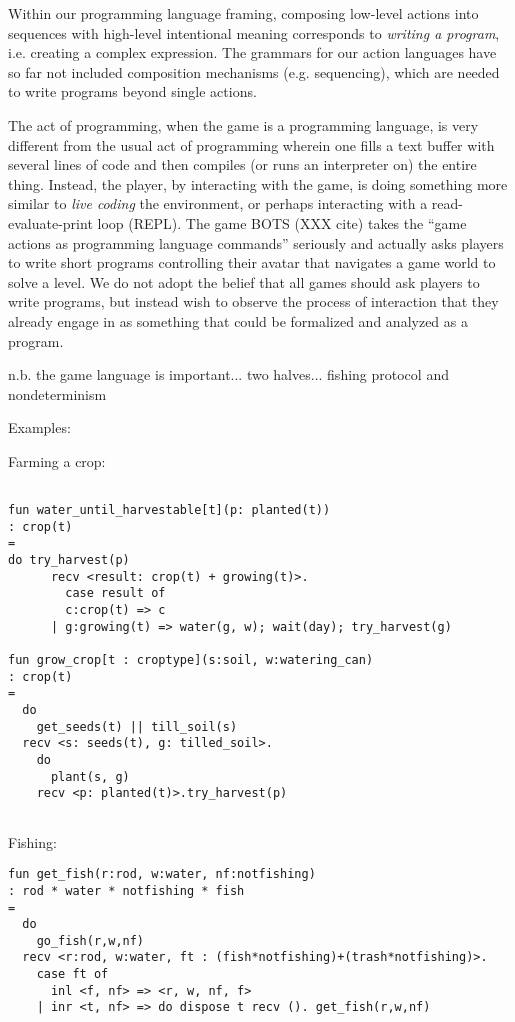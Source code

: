\documentclass[sigconf]{acmart}
\begin{document}
Within our programming language framing,
composing low-level actions into sequences with high-level intentional
meaning corresponds to {\em writing a program}, i.e. creating a complex
expression. The grammars for our action languages have so far not
included composition mechanisms (e.g. sequencing), which are needed to
write programs beyond single actions.

The act of programming, when the game is a programming language, is very
different from the usual act of programming wherein one fills a text buffer
with several lines of code and then compiles (or runs an interpreter on)
the entire thing. Instead, the player, by interacting with the game, is
doing something more similar to {\em live coding} the environment, or
perhaps interacting with a read-evaluate-print loop (REPL). The game BOTS
(XXX cite) takes the ``game actions as programming language commands''
seriously and actually asks players to write short programs controlling
their avatar that navigates a game world to solve a level. We do not adopt
the belief that all games should ask players to write programs, but instead
wish to observe the process of interaction that they already engage in as
something that could be formalized and analyzed as a program.

n.b. the game language is important... two halves...
fishing protocol and nondeterminism

Examples:

Farming a crop:
\begin{verbatim}

fun water_until_harvestable[t](p: planted(t))
: crop(t)
=
do try_harvest(p)
      recv <result: crop(t) + growing(t)>.
        case result of
        c:crop(t) => c
      | g:growing(t) => water(g, w); wait(day); try_harvest(g)

fun grow_crop[t : croptype](s:soil, w:watering_can)
: crop(t)
=
  do
    get_seeds(t) || till_soil(s)
  recv <s: seeds(t), g: tilled_soil>.
    do
      plant(s, g)
    recv <p: planted(t)>.try_harvest(p)
        
\end{verbatim}

Fishing:
\begin{verbatim}
fun get_fish(r:rod, w:water, nf:notfishing) 
: rod * water * notfishing * fish
=
  do  
    go_fish(r,w,nf)
  recv <r:rod, w:water, ft : (fish*notfishing)+(trash*notfishing)>.
    case ft of
      inl <f, nf> => <r, w, nf, f>
    | inr <t, nf> => do dispose t recv (). get_fish(r,w,nf)
\end{verbatim}
\end{document}
